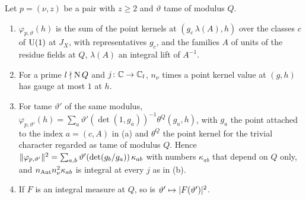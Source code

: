 \begin{lemma}\label{lem:lift-values}
Let $p=(\nu,z)$ be a pair with $z\ge2$ and $\vartheta$ tame of modulus $Q$.
\begin{enumerate}[label=\textup{(\alph*)}]
\item $\varphi_{p,\vartheta}(h)$ is the sum of the point kernels at $(g_c\,\lambda(A),h)$ over the classes $c$ of $\operatorname{U}(1)$ at $J_X$, with representatives $g_c$, and the families $A$ of units of the residue fields at $Q$, $\lambda(A)$ an integral
lift of $A^{-1}$.
\item For a prime $l\nmid\operatorname{N} Q$ and $j\colon\mathbb{C}\to\mathbb{C}_l$, $n_\nu$ times a point kernel value at $(g,h)$ has gauge at most $1$ at $h$.
\item For tame $\vartheta'$ of the same modulus, $\varphi_{p,\vartheta'}(h)=\sum_a\vartheta'(\det(1,g_a))^{-1}\theta^Q(g_a,h)$, with $g_a$ the point attached to the index $a=(c,A)$ in (a) and $\theta^Q$ the point kernel for the trivial
character regarded as tame of modulus $Q$. Hence $\lVert \varphi_{p,\vartheta'}\rVert^2=\sum_{a,b}\vartheta'(\det(g_b/g_a))\,\kappa_{ab}$ with numbers $\kappa_{ab}$ that depend on $Q$ only, and $n_{\rm Aut}n_\nu^2\kappa_{ab}$ is integral at every $j$ as in (b).
\item If $F$ is an integral measure at $Q$, so is $\vartheta'\mapsto\lvert F(\vartheta')\rvert^2$.
\end{enumerate}
\end{lemma}

